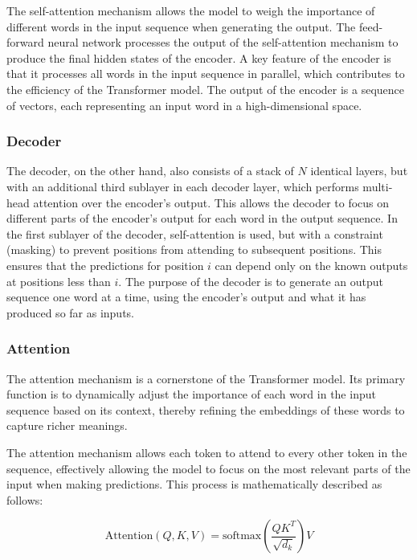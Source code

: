             The self-attention mechanism allows the model to weigh the importance of different words in the input sequence when generating the output. The feed-forward neural network processes the output of the self-attention mechanism to produce the final hidden states of the encoder. A key feature of the encoder is that it processes all words in the input sequence in parallel, which contributes to the efficiency of the Transformer model. The output of the encoder is a sequence of vectors, each representing an input word in a high-dimensional space.

            \subsubsection{Decoder}
                The decoder, on the other hand, also consists of a stack of \(N\) identical layers, but with an additional third sublayer in each decoder layer, which performs multi-head attention over the encoder's output. This allows the decoder to focus on different parts of the encoder's output for each word in the output sequence. In the first sublayer of the decoder, self-attention is used, but with a constraint (masking) to prevent positions from attending to subsequent positions. This ensures that the predictions for position \(i\) can depend only on the known outputs at positions less than \(i\). The purpose of the decoder is to generate an output sequence one word at a time, using the encoder's output and what it has produced so far as inputs.

            \subsubsection{Attention}
                The attention mechanism is a cornerstone of the Transformer model. Its primary function is to dynamically adjust the importance of each word in the input sequence based on its context, thereby refining the embeddings of these words to capture richer meanings.

                The attention mechanism allows each token to attend to every other token in the sequence, effectively allowing the model to focus on the most relevant parts of the input when making predictions. This process is mathematically described as follows:

                \begin{equation}
                    \text{Attention}(Q, K, V) = \text{softmax}\left(\frac{QK^T}{\sqrt{d_k}}\right)V
                    \label{eq:attention}
                \end{equation}

